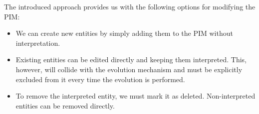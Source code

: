 \medskip

The introduced approach provides us with the following options for modifying the PIM:
\begin{itemize}
    \item We can create new entities by simply adding them to the PIM without interpretation.
    \item Existing entities can be edited directly and keeping them interpreted. This, however, will collide with the evolution mechanism and must be explicitly excluded from it every time the evolution is performed.
    \item To remove the interpreted entity, we must mark it as deleted. Non-interpreted entities can be removed directly.
\end{itemize}











